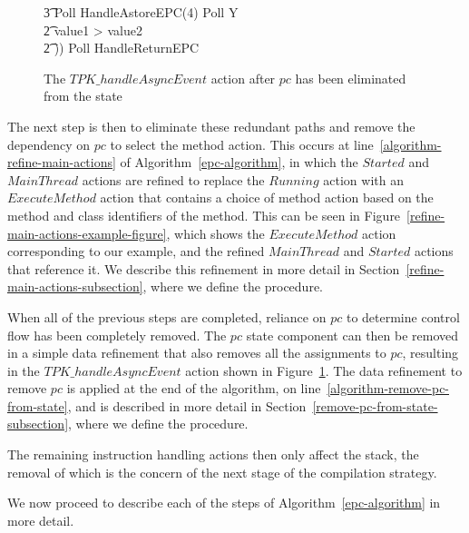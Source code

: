 \begin{figure}
\begin{circus}
    \t3 Poll \circseq HandleAstoreEPC(4) \circseq Poll \circseq Y \\
    \t2 {} \circelse value1 > value2 \circthen \Skip \\
    \t2 \circfi)) \circseq Poll \circseq HandleReturnEPC
  \end{circus}
  \caption{The $TPK\_handleAsyncEvent$ action after $pc$ has been eliminated from the state}
  \label{pc-elimination-HandleAsyncEvent-example-figure}
\end{figure}

The next step is then to eliminate these redundant paths and remove
the dependency on $pc$ to select the method action.
This occurs at line~\ref{algorithm-refine-main-actions} of
Algorithm~\ref{epc-algorithm}, in which the $Started$ and $MainThread$
actions are refined to replace the $Running$ action with an
$ExecuteMethod$ action that contains a choice of method action based
on the method and class identifiers of the method.
This can be seen in Figure~\ref{refine-main-actions-example-figure},
which shows the $ExecuteMethod$ action corresponding to our example,
and the refined $MainThread$ and $Started$ actions that reference it.
We describe this refinement in more detail in
Section~\ref{refine-main-actions-subsection}, where we define the
 procedure.

When all of the previous steps are completed, reliance on $pc$ to
determine control flow has been completely removed.
The $pc$ state component can then be removed in a simple data
refinement that also removes all the assignments to $pc$, resulting in
the $TPK\_handleAsyncEvent$ action shown in
Figure~\ref{pc-elimination-HandleAsyncEvent-example-figure}.
The data refinement to remove $pc$ is applied at the end of the
algorithm, on line~\ref{algorithm-remove-pc-from-state}, and is
described in more detail in
Section~\ref{remove-pc-from-state-subsection}, where we define the
 procedure.

The remaining instruction handling actions then only affect the stack,
the removal of which is the concern of the next stage of the
compilation strategy.

We now proceed to describe each of the steps of
Algorithm~\ref{epc-algorithm} in more detail.

